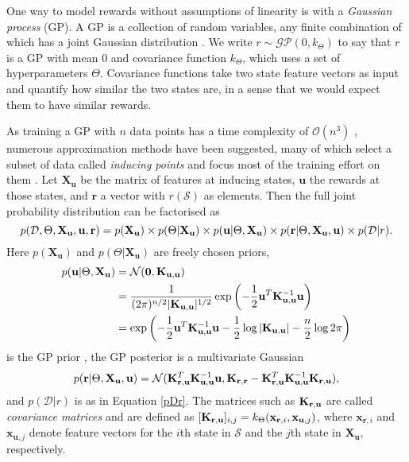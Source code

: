 \documentclass{mprop}
\theoremstyle{definition}
\begin{document}
One way to model rewards without assumptions of linearity is with a
\emph{Gaussian process} (GP). A GP is a collection of random variables, any
finite combination of which has a joint Gaussian distribution
\cite{DBLP:books/lib/RasmussenW06}. We write $r \sim \mathcal{GP}(0,
k_{\Theta})$ to say that $r$ is a GP with mean $0$ and covariance function
$k_{\Theta}$, which uses a set of hyperparameters $\Theta$. Covariance functions
take two state feature vectors as input and quantify how similar the two states
are, in a sense that we would expect them to have similar rewards.

As training a GP with $n$ data points has a time complexity of
$\mathcal{O}(n^3)$ \cite{DBLP:books/lib/RasmussenW06}, numerous approximation
methods have been suggested, many of which select a subset of data called
\emph{inducing points} and focus most of the training effort on them
\cite{DBLP:journals/corr/abs-1807-01065}. Let $\mathbf{X_u}$ be the matrix of
features at inducing states, $\mathbf{u}$ the rewards at those states, and
$\mathbf{r}$ a vector with $r(\mathcal{S})$ as elements. Then the full joint
probability distribution can be factorised as
\begin{equation} \label{full}
  p(\mathcal{D}, \Theta, \mathbf{X_u}, \mathbf{u}, \mathbf{r}) = p(\mathbf{X_u}) \times p(\Theta | \mathbf{X_u}) \times p(\mathbf{u}
  | \Theta, \mathbf{X_u}) \times p(\mathbf{r} | \Theta, \mathbf{X_u},
  \mathbf{u}) \times p(\mathcal{D} | r).
\end{equation}
Here $p(\mathbf{X_u})$ and $p(\Theta | \mathbf{X_u})$ are freely chosen priors,
\[
  \begin{split}
    p(\mathbf{u} | \Theta, \mathbf{X_u}) &= \mathcal{N}(\mathbf{0},
    \mathbf{K}_{\mathbf{u},\mathbf{u}}) \\
    &= \frac{1}{(2\pi)^{n/2}|\mathbf{K}_{\mathbf{u},\mathbf{u}}|^{1/2}}\exp \left( -\frac{1}{2}
      \mathbf{u}^T\mathbf{K}_{\mathbf{u},\mathbf{u}}^{-1}\mathbf{u} \right) \\
    &= \exp\left(-\frac{1}{2}\mathbf{u}^T\mathbf{K}_{\mathbf{u},\mathbf{u}}^{-1}\mathbf{u} -
      \frac{1}{2}\log|\mathbf{K}_{\mathbf{u},\mathbf{u}}| - \frac{n}{2}\log 2\pi\right)
  \end{split}
\]
is the GP prior \cite{DBLP:books/lib/RasmussenW06}, the GP posterior is a
multivariate Gaussian \cite{DBLP:conf/nips/LevinePK11}
\begin{equation} \label{eq:r}
  p(\mathbf{r} | \Theta, \mathbf{X_u}, \mathbf{u}) =
  \mathcal{N}(\mathbf{K}_{\mathbf{r},\mathbf{u}}^T\mathbf{K}_{\mathbf{u},\mathbf{u}}^{-1}\mathbf{u}, \mathbf{K}_{\mathbf{r},\mathbf{r}} - \mathbf{K}_{\mathbf{r},\mathbf{u}}^T\mathbf{K}_{\mathbf{u},\mathbf{u}}^{-1}\mathbf{K}_{\mathbf{r},\mathbf{u}}),
\end{equation}
and $p(\mathcal{D} | r)$ is as in Equation \ref{pDr}. The matrices such as
$\mathbf{K}_{\mathbf{r},\mathbf{u}}$ are called \emph{covariance matrices} and are defined as
$[\mathbf{K}_{\mathbf{r},\mathbf{u}}]_{i,j} = k_\Theta(\mathbf{x}_{\mathbf{r},i}, \mathbf{x}_{\mathbf{u},j})$,
where $\mathbf{x}_{\mathbf{r},i}$ and $\mathbf{x}_{\mathbf{u},j}$ denote feature
vectors for the $i$th state in $\mathcal{S}$ and the $j$th state in
$\mathbf{X_u}$, respectively.
\end{document}
